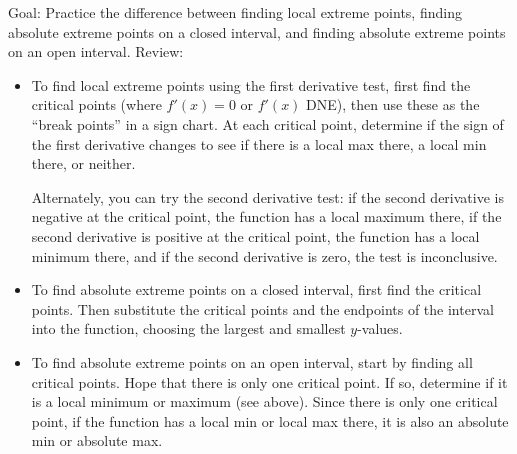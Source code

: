 \documentclass[letterpaper,11pt]{article}
\begin{document}

\noindent Goal:  Practice the difference between finding local extreme points, finding absolute extreme points on a closed interval, and finding absolute extreme points on an open interval. Review:
\begin{itemize}
\item  To find local extreme points using the first derivative test, first find the critical points (where $f'(x) = 0$ or $f'(x)$ DNE), then use these as the ``break points'' in a sign chart.
	At each critical point, determine if the sign of the first derivative changes to see if there is a local max there, a local min there, or neither.  

	Alternately, you can try the second derivative test: if the second derivative is negative at the critical point, the function has a local maximum there, if the second derivative is positive at the critical point, the function has a local minimum there, and if the second derivative is zero, the test is inconclusive.
\item  To find absolute extreme points on a closed interval, first find the critical points.  Then substitute the critical points and the endpoints of the interval into the function, choosing the largest and smallest $y$-values.
\item  To find absolute extreme points on an open interval, start by finding all critical points.  Hope that there is only one critical point.  If so, determine if it is a local minimum or maximum (see above).  
	Since there is only one critical point, if the function has a local min or local max there, it is also an absolute min or absolute max.
\end{itemize}
\end{document}
